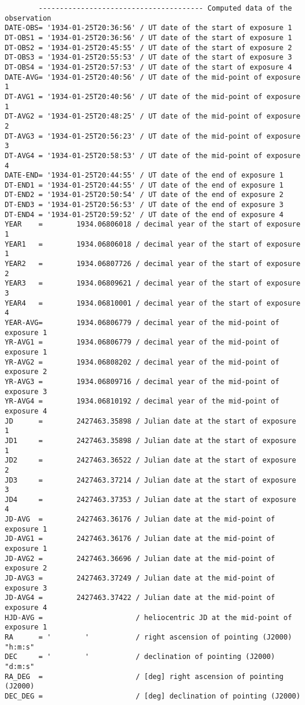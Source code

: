\documentclass[11pt]{ivoa}
\begin{document}
\begin{lstlisting}
        --------------------------------------- Computed data of the observation
DATE-OBS= '1934-01-25T20:36:56' / UT date of the start of exposure 1
DT-OBS1 = '1934-01-25T20:36:56' / UT date of the start of exposure 1
DT-OBS2 = '1934-01-25T20:45:55' / UT date of the start of exposure 2
DT-OBS3 = '1934-01-25T20:55:53' / UT date of the start of exposure 3
DT-OBS4 = '1934-01-25T20:57:53' / UT date of the start of exposure 4
DATE-AVG= '1934-01-25T20:40:56' / UT date of the mid-point of exposure 1
DT-AVG1 = '1934-01-25T20:40:56' / UT date of the mid-point of exposure 1
DT-AVG2 = '1934-01-25T20:48:25' / UT date of the mid-point of exposure 2
DT-AVG3 = '1934-01-25T20:56:23' / UT date of the mid-point of exposure 3
DT-AVG4 = '1934-01-25T20:58:53' / UT date of the mid-point of exposure 4
DATE-END= '1934-01-25T20:44:55' / UT date of the end of exposure 1
DT-END1 = '1934-01-25T20:44:55' / UT date of the end of exposure 1
DT-END2 = '1934-01-25T20:50:54' / UT date of the end of exposure 2
DT-END3 = '1934-01-25T20:56:53' / UT date of the end of exposure 3
DT-END4 = '1934-01-25T20:59:52' / UT date of the end of exposure 4
YEAR    =        1934.06806018 / decimal year of the start of exposure 1
YEAR1   =        1934.06806018 / decimal year of the start of exposure 1
YEAR2   =        1934.06807726 / decimal year of the start of exposure 2
YEAR3   =        1934.06809621 / decimal year of the start of exposure 3
YEAR4   =        1934.06810001 / decimal year of the start of exposure 4
YEAR-AVG=        1934.06806779 / decimal year of the mid-point of exposure 1
YR-AVG1 =        1934.06806779 / decimal year of the mid-point of exposure 1
YR-AVG2 =        1934.06808202 / decimal year of the mid-point of exposure 2
YR-AVG3 =        1934.06809716 / decimal year of the mid-point of exposure 3
YR-AVG4 =        1934.06810192 / decimal year of the mid-point of exposure 4
JD      =        2427463.35898 / Julian date at the start of exposure 1
JD1     =        2427463.35898 / Julian date at the start of exposure 1
JD2     =        2427463.36522 / Julian date at the start of exposure 2
JD3     =        2427463.37214 / Julian date at the start of exposure 3
JD4     =        2427463.37353 / Julian date at the start of exposure 4
JD-AVG  =        2427463.36176 / Julian date at the mid-point of exposure 1
JD-AVG1 =        2427463.36176 / Julian date at the mid-point of exposure 1
JD-AVG2 =        2427463.36696 / Julian date at the mid-point of exposure 2
JD-AVG3 =        2427463.37249 / Julian date at the mid-point of exposure 3
JD-AVG4 =        2427463.37422 / Julian date at the mid-point of exposure 4
HJD-AVG =                      / heliocentric JD at the mid-point of exposure 1
RA      = '        '           / right ascension of pointing (J2000) "h:m:s"
DEC     = '        '           / declination of pointing (J2000) "d:m:s"
RA_DEG  =                      / [deg] right ascension of pointing (J2000)
DEC_DEG =                      / [deg] declination of pointing (J2000)
\end{lstlisting}
\end{document}
